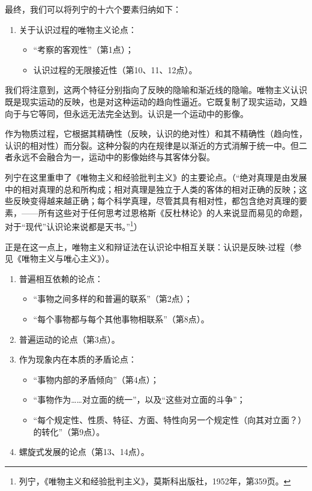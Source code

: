 \documentclass[fontset=fandol, a4paper, 12pt, twoside]{ctexart}
\begin{document}
最终，我们可以将列宁的十六个要素归纳如下：

\begin{enumerate}
    \item 关于认识过程的唯物主义论点：
    \begin{itemize}
        \item “考察的客观性”（第1点）；
        \item 认识过程的无限接近性（第10、11、12点）。
    \end{itemize}
\end{enumerate}

我们将注意到，这两个特征分别指向了反映的隐喻和渐近线的隐喻。唯物主义认识既是现实运动的反映，也是对这种运动的趋向性逼近。它既复制了现实运动，又趋向于与它等同，但永远无法完全达到。认识是一个运动中的影像。

作为物质过程，它根据其精确性（反映，认识的绝对性）和其不精确性（趋向性，认识的相对性）而分裂。这种分裂的内在规律是以渐近的方式消解于统一中。但二者永远不会融合为一，运动中的影像始终与其客体分裂。

列宁在这里重申了《唯物主义和经验批判主义》的主要论点。（“绝对真理是由发展中的相对真理的总和所构成；相对真理是独立于人类的客体的相对正确的反映；这些反映变得越来越正确；每个科学真理，尽管其具有相对性，都包含绝对真理的要素，——所有这些对于任何思考过恩格斯《反杜林论》的人来说显而易见的命题，对于“现代”认识论来说都是天书。”\footnote{列宁，《唯物主义和经验批判主义》，莫斯科出版社，1952年，第359页。}）

正是在这一点上，唯物主义和辩证法在认识论中相互关联：认识是反映-过程（参见《唯物主义与唯心主义》）。

\begin{enumerate}[resume]
    \item 普遍相互依赖的论点：
    \begin{itemize}
        \item “事物之间多样的和普遍的联系”（第2点）；
        \item “每个事物都与每个其他事物相联系”（第8点）。
    \end{itemize}
    \item 普遍运动的论点（第3点）。
    \item 作为现象内在本质的矛盾论点：
    \begin{itemize}
        \item “事物内部的矛盾倾向”（第4点）；
        \item “事物作为……对立面的统一”，以及“这些对立面的斗争”；
        \item “每个规定性、性质、特征、方面、特性向另一个规定性（向其对立面？）的转化”（第9点）。
    \end{itemize}
    \item 螺旋式发展的论点（第13、14点）。
\end{enumerate}
\end{document}
